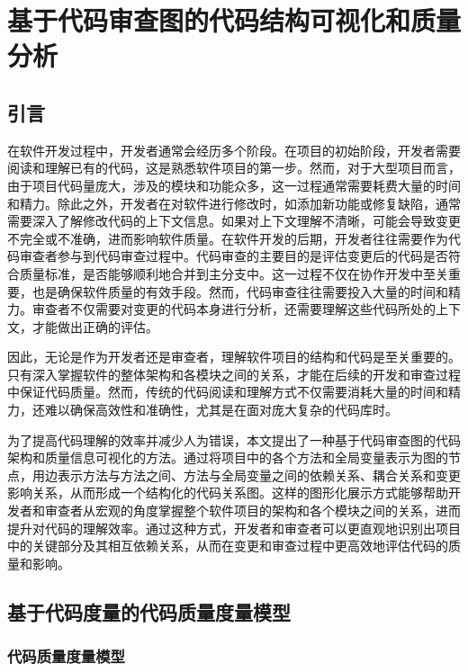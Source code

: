 \chapter{基于代码审查图的代码结构可视化和质量分析}
\section{引言}


在软件开发过程中，开发者通常会经历多个阶段。在项目的初始阶段，开发者需要阅读和理解已有的代码，这是熟悉软件项目的第一步。然而，对于大型项目而言，由于项目代码量庞大，涉及的模块和功能众多，这一过程通常需要耗费大量的时间和精力。除此之外，开发者在对软件进行修改时，如添加新功能或修复缺陷，通常需要深入了解修改代码的上下文信息。如果对上下文理解不清晰，可能会导致变更不完全或不准确，进而影响软件质量。在软件开发的后期，开发者往往需要作为代码审查者参与到代码审查过程中。代码审查的主要目的是评估变更后的代码是否符合质量标准，是否能够顺利地合并到主分支中。这一过程不仅在协作开发中至关重要，也是确保软件质量的有效手段。然而，代码审查往往需要投入大量的时间和精力\cite{花子涵2024代码审查自动化研究综述}。审查者不仅需要对变更的代码本身进行分析，还需要理解这些代码所处的上下文，才能做出正确的评估。

因此，无论是作为开发者还是审查者，理解软件项目的结构和代码是至关重要的。只有深入掌握软件的整体架构和各模块之间的关系，才能在后续的开发和审查过程中保证代码质量。然而，传统的代码阅读和理解方式不仅需要消耗大量的时间和精力，还难以确保高效性和准确性，尤其是在面对庞大复杂的代码库时。

为了提高代码理解的效率并减少人为错误，本文提出了一种基于代码审查图的代码架构和质量信息可视化的方法。通过将项目中的各个方法和全局变量表示为图的节点，用边表示方法与方法之间、方法与全局变量之间的依赖关系、耦合关系和变更影响关系，从而形成一个结构化的代码关系图。这样的图形化展示方式能够帮助开发者和审查者从宏观的角度掌握整个软件项目的架构和各个模块之间的关系，进而提升对代码的理解效率。通过这种方式，开发者和审查者可以更直观地识别出项目中的关键部分及其相互依赖关系，从而在变更和审查过程中更高效地评估代码的质量和影响。

\section{基于代码度量的代码质量度量模型}

\subsection{代码质量度量模型}

